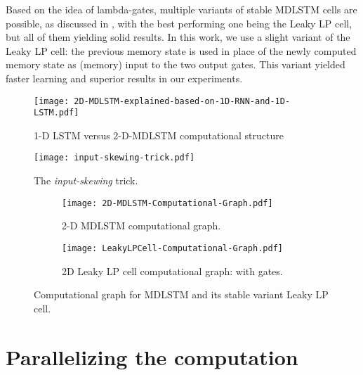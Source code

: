 \documentclass[conference]{IEEEtran}
\renewcommand{\ac}[1]{\gls{#1}}
\begin{document}
Based on the idea of lambda-gates, multiple variants of stable \ac{MDLSTM} cells are possible, as discussed in \cite{LeifertEtAl2014}, with the best performing 
one being the Leaky LP cell, but all of them yielding solid results. In this work, we use a slight variant of the Leaky LP cell: 
the previous memory state is used in place of the newly computed memory state as (memory) input to the two output gates. 
This variant yielded faster learning and superior results in our experiments.



\begin{figure*}[!htb]
\begin{center}
\begin{minipage}{.54\textwidth}
  \texttt{[image: 2D-MDLSTM-explained-based-on-1D-RNN-and-1D-LSTM.pdf]}
 \caption{1-D LSTM versus 2-D-MDLSTM computational structure}
\label{figure:2dmdlstm-explained-from-1d}
\end{minipage}
\begin{minipage}{.42\textwidth}
  \texttt{[image: input-skewing-trick.pdf]}
 \caption{The \emph{input-skewing} trick.} 
\label{figure:input-skewing-trick}
\end{minipage}
\end{center}
\end{figure*}


\begin{figure*}
\begin{center}
\hspace{-2cm}
\begin{subfigure}[b]{0.37\textwidth}
  \texttt{[image: 2D-MDLSTM-Computational-Graph.pdf]}
 \caption{2-D MDLSTM computational graph.}
\label{figure:2dmdlstm-compuational-graph}
\end{subfigure}
\hspace{2.5cm}
\begin{subfigure}[b]{0.37\textwidth}
 \texttt{[image: LeakyLPCell-Computational-Graph.pdf]}
 \caption{2D Leaky LP cell computational graph: with  gates.}
\label{figure:leaky-lp-cell-compuational-graph} 
\end{subfigure}
\caption{Computational graph for \ac{MDLSTM} and its stable variant Leaky LP cell.}
\end{center}
\end{figure*}



\section{Parallelizing the computation}
\end{document}
